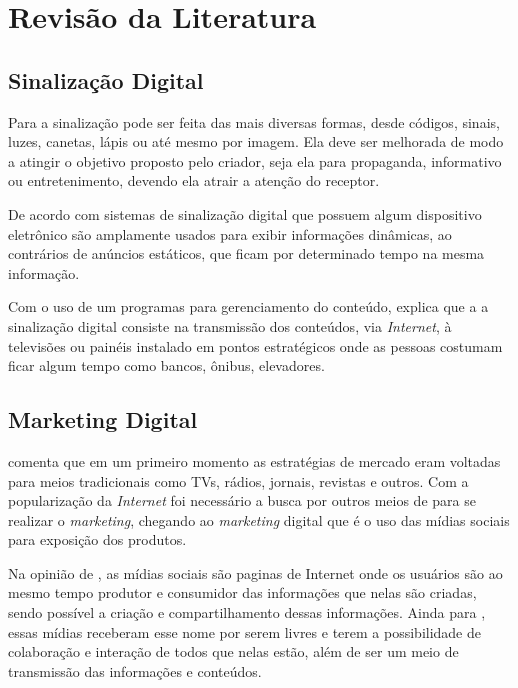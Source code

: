 \documentclass[
	12pt,				%
	openright,			%
	oneside,			%
	a4paper,			%
	english,			%
	french,				%
	spanish,			%
	brazil,				%
	]{abntex2}
\begin{document}
\section*{Revisão da Literatura}
	
	\subsection*{Sinalização Digital}
	Para \cite{munari2006} a sinalização pode ser feita das mais diversas formas, desde códigos, sinais, luzes, canetas, lápis ou até mesmo por imagem. Ela deve ser melhorada de modo a  atingir o objetivo proposto pelo criador, seja ela para propaganda, informativo ou entretenimento, devendo ela atrair a atenção do receptor. 
	
	De acordo com \cite{mishima2016} sistemas de sinalização digital que possuem algum dispositivo eletrônico são amplamente usados para exibir informações dinâmicas, ao contrários de anúncios estáticos, que ficam por determinado tempo na mesma informação. 
	
	Com o uso de um programas para gerenciamento do conteúdo, \cite{machado2010} explica que a a sinalização digital consiste na transmissão dos conteúdos, via \textit{Internet}, à televisões ou painéis instalado em pontos estratégicos onde as pessoas costumam ficar algum tempo como bancos, ônibus, elevadores.
	
	\subsection*{Marketing Digital}
	\cite{santos2014} comenta que em um primeiro momento as estratégias de mercado eram voltadas para meios tradicionais como TVs, rádios, jornais, revistas e outros. Com a popularização da \textit{Internet} foi necessário a busca por outros meios de para se realizar o \textit{marketing}, chegando ao \textit{marketing} digital que é o uso das mídias sociais para exposição dos produtos.
	
	Na opinião de \cite{torres2000}, as mídias sociais são paginas de Internet onde os usuários são ao mesmo tempo produtor e consumidor das informações que nelas são criadas, sendo possível a criação e compartilhamento dessas informações. Ainda para \cite{torres2000}, essas mídias receberam esse nome por serem livres e terem a possibilidade de colaboração e interação de todos que nelas estão, além de ser um meio de transmissão das informações e conteúdos.
	
\end{document}
